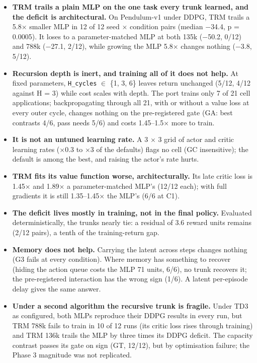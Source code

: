 \documentclass[11pt]{article}
\begin{document}
\begin{itemize}
\item \textbf{TRM trails a plain MLP on the one task every trunk learned, and the deficit is architectural.} On Pendulum-v1 under DDPG, TRM trails a 5.8$\times$ smaller MLP in 12 of 12 seed $\times$ condition pairs (median $-$34.4, p = 0.0005). It loses to a parameter-matched MLP at both 135k ($-$50.2, 0/12) and 788k ($-$27.1, 2/12), while growing the MLP 5.8$\times$ changes nothing ($-$3.8, 5/12).
\item \textbf{Recursion depth is inert, and training all of it does not help.} At fixed parameters, \texttt{H\_cycles} $\in$ \{1, 3, 6\} leaves return unchanged (5/12, 4/12 against H = 3) while cost scales with depth. The port trains only 7 of 21 cell applications; backpropagating through all 21, with or without a value loss at every outer cycle, changes nothing on the pre-registered gate (GA: best contrasts 4/6, pass needs 5/6) and costs 1.45--1.5$\times$ more to train.
\item \textbf{It is not an untuned learning rate.} A 3 $\times$ 3 grid of actor and critic learning rates ($\times$0.3 to $\times$3 of the defaults) flags no cell (GC insensitive); the default is among the best, and raising the actor's rate hurts.
\item \textbf{TRM fits its value function worse, architecturally.} Its late critic loss is 1.45$\times$ and 1.89$\times$ a parameter-matched MLP's (12/12 each); with full gradients it is still 1.35--1.45$\times$ the MLP's (6/6 at C1).
\item \textbf{The deficit lives mostly in training, not in the final policy.} Evaluated deterministically, the trunks nearly tie: a residual of 3.6 reward units remains (2/12 pairs), a tenth of the training-return gap.
\item \textbf{Memory does not help.} Carrying the latent across steps changes nothing (G3 fails at every condition). Where memory has something to recover (hiding the action queue costs the MLP 71 units, 6/6), no trunk recovers it; the pre-registered interaction has the wrong sign (1/6). A latent per-episode delay gives the same answer.
\item \textbf{Under a second algorithm the recursive trunk is fragile.} Under TD3 as configured, both MLPs reproduce their DDPG results in every run, but TRM 788k fails to train in 10 of 12 runs (its critic loss rises through training) and TRM 136k trails the MLP by three times its DDPG deficit. The capacity contrast passes its gate on sign (GT, 12/12), but by optimisation failure; the Phase 3 magnitude was not replicated.

\end{itemize}
\end{document}
